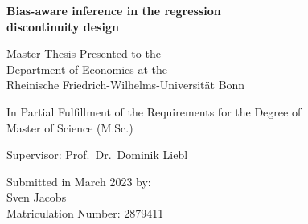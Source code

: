 \documentclass[a4paper, 12pt, bibliography=totoc]{scrartcl}
\begin{document}

\begin{titlepage}
	\vspace*{\fill}
	\begin{center}
	 	\LARGE
		\textsf{\textbf{Bias-aware inference in the regression \\ discontinuity design}}  
		\vspace{2.5cm}
	 
		\large	
		Master Thesis Presented to the \\  
		Department of Economics at the \\  
		Rheinische Friedrich-Wilhelms-Universität Bonn
		\vspace{1.0cm}  
		
		In Partial Fulfillment of the Requirements for the Degree of \\
		Master of Science (M.Sc.)
		\vspace{5.0cm}
		
		Supervisor: Prof.\ Dr.\ Dominik Liebl 
		\vspace{1.5cm}
		
		Submitted in March 2023 by: \\
		Sven Jacobs \\
		Matriculation Number: 2879411
	\end{center}
	\vspace*{\fill}
\end{titlepage}

\restoregeometry 
	
\newpage

\setcounter{page}{2}

\tableofcontents  

\newpage












\clearpage



\clearpage

\nocite{R_2023} 
\printbibliography

\newpage

\end{document}
